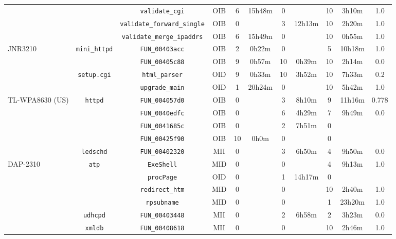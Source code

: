 \begin{table}[ht]
\begin{tabular}{|l||c|c|c|c|c|c|c|c|c|c|}
\cline{3-11}
 &  & \texttt{validate\_cgi} & OIB & 6 & 15h48m & 0 &  & 10 & 3h10m & 1.0 \\
\cline{3-11}
 &  & \texttt{validate\_forward\_single} & OIB & 0 &  & 3 & 12h13m & 10 & 2h20m & 1.0 \\
\cline{3-11}
 &  & \texttt{validate\_merge\_ipaddrs} & OIB & 6 & 15h49m & 0 &  & 10 & 0h55m & 1.0 \\
\cline{3-11}
\cline{2-11}
\cline{1-1}
\multirow{4}{*}{JNR3210} & \multirow{2}{*}{\texttt{mini\_httpd}} & \texttt{FUN\_00403acc} & OIB & 2 & 0h22m & 0 &  & 5 & 10h18m & 1.0 \\
\cline{3-11}
 &  & \texttt{FUN\_00405c88} & OIB & 9 & 0h57m & 10 & 0h39m & 10 & 2h14m & 0.0 \\
\cline{3-11}
\cline{2-11}
 & \multirow{2}{*}{\texttt{setup.cgi}} & \texttt{html\_parser} & OID & 9 & 0h33m & 10 & 3h52m & 10 & 7h33m & 0.2 \\
\cline{3-11}
 &  & \texttt{upgrade\_main} & OID & 1 & 20h24m & 0 &  & 10 & 5h42m & 1.0 \\
\cline{3-11}
\cline{2-11}
\cline{1-1}
\multirow{5}{*}{TL-WPA8630 (US)} & \multirow{4}{*}{\texttt{httpd}} & \texttt{FUN\_004057d0} & OIB & 0 &  & 3 & 8h10m & 9 & 11h16m & 0.778 \\
\cline{3-11}
 &  & \texttt{FUN\_0040edfc} & OIB & 0 &  & 6 & 4h29m & 7 & 9h49m & 0.0 \\
\cline{3-11}
 &  & \texttt{FUN\_0041685c} & OIB & 0 &  & 2 & 7h51m & 0 &  &  \\
\cline{3-11}
 &  & \texttt{FUN\_00425f90} & OIB & 10 & 0h0m & 0 &  & 0 &  &  \\
\cline{3-11}
\cline{2-11}
 & \multirow{1}{*}{\texttt{ledschd}} & \texttt{FUN\_00402320} & MII & 0 &  & 3 & 6h50m & 4 & 9h50m & 0.0 \\
\cline{3-11}
\cline{2-11}
\cline{1-1}
\multirow{7}{*}{DAP-2310} & \multirow{4}{*}{\texttt{atp}} & \texttt{ExeShell} & MID & 0 &  & 0 &  & 4 & 9h13m & 1.0 \\
\cline{3-11}
 &  & \texttt{procPage} & OID & 0 &  & 1 & 14h17m & 0 &  &  \\
\cline{3-11}
 &  & \texttt{redirect\_htm} & MID & 0 &  & 0 &  & 10 & 2h40m & 1.0 \\
\cline{3-11}
 &  & \texttt{rpsubname} & MID & 0 &  & 0 &  & 1 & 23h20m & 1.0 \\
\cline{3-11}
\cline{2-11}
 & \multirow{1}{*}{\texttt{udhcpd}} & \texttt{FUN\_00403448} & MII & 0 &  & 2 & 6h58m & 2 & 3h23m & 0.0 \\
\cline{3-11}
\cline{2-11}
 & \multirow{2}{*}{\texttt{xmldb}} & \texttt{FUN\_00408618} & MII & 0 &  & 0 &  & 10 & 2h46m & 1.0 \\

\end{tabular}
\end{table}
